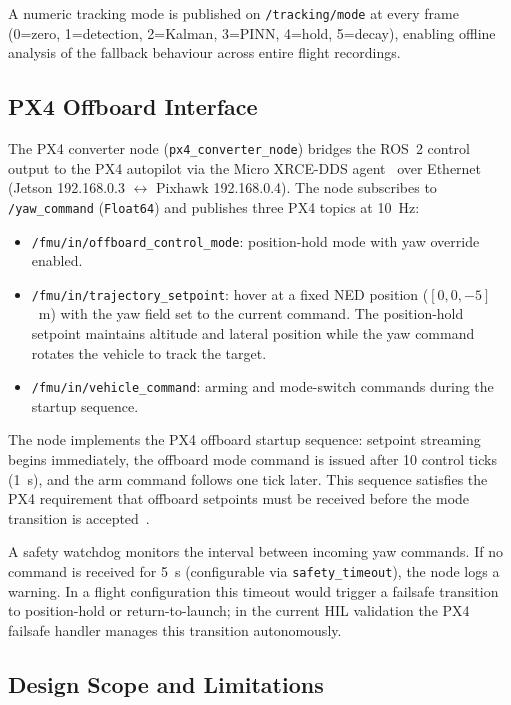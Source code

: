 \documentclass[11pt,letterpaper]{article}
\begin{document}
A numeric tracking mode is published on \texttt{/tracking/mode} at
every frame (0=zero, 1=detection, 2=Kalman, 3=PINN, 4=hold, 5=decay),
enabling offline analysis of the fallback behaviour across entire
flight recordings.

\subsection{PX4 Offboard Interface}
\label{sec:px4_offboard}

The PX4 converter node (\texttt{px4\_converter\_node}) bridges the
ROS~2 control output to the PX4 autopilot via the Micro XRCE-DDS
agent~\cite{eprosimadds} over Ethernet (Jetson 192.168.0.3
$\leftrightarrow$ Pixhawk 192.168.0.4).  The node subscribes to
\texttt{/yaw\_command} (\texttt{Float64}) and publishes three PX4
topics at 10~Hz:

\begin{itemize}
    \item \texttt{/fmu/in/offboard\_control\_mode}: position-hold mode
          with yaw override enabled.
    \item \texttt{/fmu/in/trajectory\_setpoint}: hover at a fixed NED
          position ($[0, 0, -5]$~m) with the yaw field set to the
          current command.  The position-hold setpoint maintains
          altitude and lateral position while the yaw command rotates
          the vehicle to track the target.
    \item \texttt{/fmu/in/vehicle\_command}: arming and mode-switch
          commands during the startup sequence.
\end{itemize}

The node implements the PX4 offboard startup sequence: setpoint
streaming begins immediately, the offboard mode command is issued after
10 control ticks (1~s), and the arm command follows one tick later.
This sequence satisfies the PX4 requirement that offboard setpoints must
be received before the mode transition is accepted~\cite{px4docs}.

A safety watchdog monitors the interval between incoming yaw commands.
If no command is received for 5~s (configurable via
\texttt{safety\_timeout}), the node logs a warning.
In a flight configuration this timeout would trigger a failsafe
transition to position-hold or return-to-launch; in the current HIL
validation the PX4 failsafe handler manages this transition
autonomously.

\subsection{Design Scope and Limitations}
\label{sec:control_scope}
\end{document}
